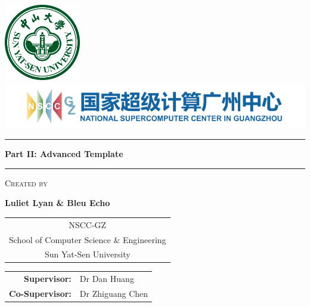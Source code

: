 \documentclass[8pt]{report}
\makeatletter
\newcommand{\studentname}{Luliet Lyan \& Bleu Echo}
\newcommand{\researchcentre}{NSCC-GZ}
\newcommand{\parttwotitle}{Part II: Advanced Template}
\newcommand{\supervisorA}{Dr Dan Huang}  %
\newcommand{\supervisorB}{Dr Zhiguang Chen}   %
\renewenvironment{titlepage}{%
  \cleardoublepage
  \if@twocolumn
    \@restonecoltrue\onecolumn
  \else
    \@restonecolfalse\newpage
  \fi
  \thispagestyle{empty}%
}{%
  \if@restonecol\twocolumn \else \newpage \fi
}
\makeatother
\begin{document}
\begin{titlepage}
    \centering
    
    \vspace{1cm}
	\includegraphics[width=0.25\textwidth]{figures/SYSU.pdf}
    \includegraphics[width=1.0\textwidth]{figures/NSCC-GZ.pdf}
    \vspace{1cm}

    \begin{minipage}{1.0\textwidth}
        \centering

		\rule{\textwidth}{3pt}
		\vspace{0.5cm}

        \fontsize{28}{30}\bfseries
        \parttwotitle

		\vspace{0.5cm}
		\rule{\textwidth}{3pt}
    \end{minipage}

    \vspace{0.8cm}
    
	\setlength{\fboxrule}{2pt} %
	\setlength{\fboxsep}{1cm}  %
	\begin{minipage}{0.75\textwidth} %
		\centering
		\vspace{1.3cm}

		\fontsize{14}{16}\selectfont
		\textsc{Created by} %
		
		\vspace{0.8cm}
		\fontsize{20}{24}\selectfont
		\textbf{\studentname}
		
		\vspace{0.8cm}
		\fontsize{12}{14}\selectfont
		\begin{tabular}{c}
			\researchcentre \\
			School of Computer Science \& Engineering \\
			Sun Yat-Sen University
		\end{tabular}
	
		\vspace{0.8cm}
		
		\begin{tabular}{rl}
			\textbf{Supervisor:} & \supervisorA \\
			\textbf{Co-Supervisor:} & \supervisorB
		\end{tabular}

	\end{minipage}

    \vfill
\end{titlepage}

\begin{multicols}{2}








\end{multicols}
\end{document}
